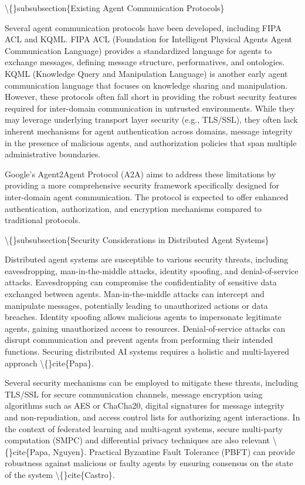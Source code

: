 \documentclass{article}
\begin{document}
\textbackslash\{\}subsubsection\{Existing Agent Communication Protocols\}

Several agent communication protocols have been developed, including FIPA ACL and KQML. FIPA ACL (Foundation for Intelligent Physical Agents Agent Communication Language) provides a standardized language for agents to exchange messages, defining message structure, performatives, and ontologies. KQML (Knowledge Query and Manipulation Language) is another early agent communication language that focuses on knowledge sharing and manipulation. However, these protocols often fall short in providing the robust security features required for inter-domain communication in untrusted environments. While they may leverage underlying transport layer security (e.g., TLS/SSL), they often lack inherent mechanisms for agent authentication across domains, message integrity in the presence of malicious agents, and authorization policies that span multiple administrative boundaries.

Google's Agent2Agent Protocol (A2A) aims to address these limitations by providing a more comprehensive security framework specifically designed for inter-domain agent communication. The protocol is expected to offer enhanced authentication, authorization, and encryption mechanisms compared to traditional protocols.

\textbackslash\{\}subsubsection\{Security Considerations in Distributed Agent Systems\}

Distributed agent systems are susceptible to various security threats, including eavesdropping, man-in-the-middle attacks, identity spoofing, and denial-of-service attacks. Eavesdropping can compromise the confidentiality of sensitive data exchanged between agents. Man-in-the-middle attacks can intercept and manipulate messages, potentially leading to unauthorized actions or data breaches. Identity spoofing allows malicious agents to impersonate legitimate agents, gaining unauthorized access to resources. Denial-of-service attacks can disrupt communication and prevent agents from performing their intended functions. Securing distributed AI systems requires a holistic and multi-layered approach \textbackslash\{\}cite\{Papa\}.

Several security mechanisms can be employed to mitigate these threats, including TLS/SSL for secure communication channels, message encryption using algorithms such as AES or ChaCha20, digital signatures for message integrity and non-repudiation, and access control lists for authorizing agent interactions. In the context of federated learning and multi-agent systems, secure multi-party computation (SMPC) and differential privacy techniques are also relevant \textbackslash\{\}cite\{Papa, Nguyen\}. Practical Byzantine Fault Tolerance (PBFT) can provide robustness against malicious or faulty agents by ensuring consensus on the state of the system \textbackslash\{\}cite\{Castro\}.
\end{document}
